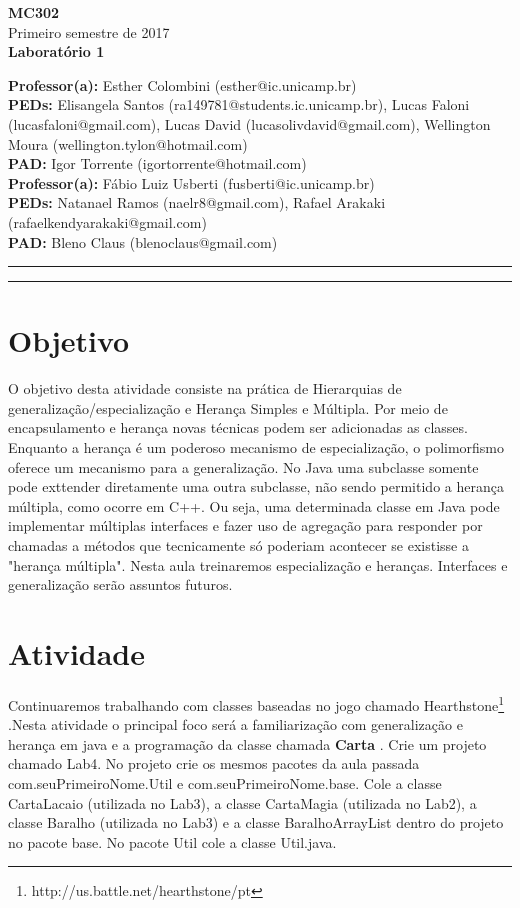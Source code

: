 \documentclass[10pt]{article}
\begin{document}

\begin{large}
	\begin{center}
		\textbf{MC302} \\
		Primeiro semestre de 2017 \\ \vspace{0.5cm}
		\textbf{Laboratório 1}
	\end{center}
\end{large}
\vspace{0.25cm}
\noindent \textbf{Professor(a):} Esther Colombini (esther@ic.unicamp.br) \\
\textbf{PEDs:} Elisangela Santos (ra149781@students.ic.unicamp.br), Lucas Faloni (lucasfaloni@gmail.com), Lucas David (lucasolivdavid@gmail.com), Wellington Moura (wellington.tylon@hotmail.com) \\
\textbf{PAD:} Igor Torrente (igortorrente@hotmail.com) \\
\noindent \textbf{Professor(a):} Fábio Luiz Usberti (fusberti@ic.unicamp.br) \\
\textbf{PEDs:} Natanael Ramos (naelr8@gmail.com), Rafael Arakaki (rafaelkendyarakaki@gmail.com) \\
\textbf{PAD:} Bleno Claus (blenoclaus@gmail.com) \\

\hrule \hrule

\section{Objetivo}

O objetivo desta atividade consiste na prática de Hierarquias de generalização/especialização e Herança Simples e Múltipla.
Por meio de encapsulamento e herança novas técnicas podem ser adicionadas as classes. Enquanto a herança é um poderoso mecanismo de especialização, o polimorfismo oferece um mecanismo para a generalização. No Java uma subclasse somente pode exttender diretamente uma outra subclasse, não sendo permitido a herança múltipla, como ocorre em C++. Ou seja, uma determinada classe em Java pode implementar múltiplas interfaces e fazer uso de agregação para responder por chamadas a métodos que tecnicamente só poderiam acontecer se existisse a "herança múltipla".
Nesta aula treinaremos especialização e heranças. Interfaces e generalização serão assuntos futuros.

\section{Atividade}
Continuaremos trabalhando com classes baseadas no jogo chamado Hearthstone\footnote{http://us.battle.net/hearthstone/pt} \textcopyright.Nesta atividade o principal foco será a familiarização com generalização e herança em java e a programação da classe chamada \textbf{Carta} . Crie um projeto chamado Lab4. No projeto crie os mesmos pacotes da aula passada com.seuPrimeiroNome.Util e com.seuPrimeiroNome.base. Cole a classe CartaLacaio (utilizada no Lab3), a classe CartaMagia (utilizada no Lab2), a classe Baralho (utilizada no Lab3) e a classe BaralhoArrayList dentro do projeto no pacote base.
No pacote Util cole a classe Util.java.
\end{document}
